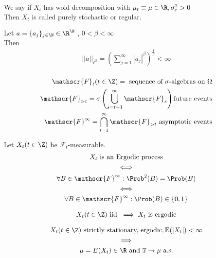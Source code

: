 \documentclass[answers,12pt,addpoints]{exam}
\begin{document}
\begin{definition}
    We say if $X_t$ has wold decomposition with $\mu_t \equiv \mu \in \R, \sigma_{\epsilon}^2 > 0$\\
    Then $X_t$ is called purely stochastic or regular.\\
\end{definition}
\begin{definition}
    Let $a = \{a_j\}_{j\in \N} \in \R^{\N}$ , $0 < \beta < \infty$\\
    Then 
    \begin{align*}
        || a ||_{\ell^{\beta}} = \left( \sum_{j=1}^{\infty} |a_j|^{\beta} \right)^{\frac{1}{\beta}} < \infty\\
    \end{align*}
\end{definition}
\begin{definition}
    \begin{align*}
        \mathscr{F}_t(t \in \Z) = \text{ sequence of $\sigma$-algebras on } \Omega\\
        \mathscr{F}_{>t} = \sigma\left( \bigcup_{s=t+1}^{\infty} \mathscr{F}_s \right) \text{future events}\\
        \mathscr{F}^{\infty} = \bigcap_{t=1}^{\infty} \mathscr{F}_{>t} \text{ asymptotic events}\\
    \end{align*}
\end{definition}
\begin{definition}
    Let $X_t(t \in \Z)$ be $\mathscr{F}_t$-measurable.\\
    \begin{gather*}
        X_t \text{ is an Ergodic process} \\
        \iff \\
        \forall B \in \mathscr{F}^{\infty}: \Prob^2(B) = \Prob(B) \\
        \iff \\
        \forall B \in \mathscr{F}^{\infty}: \Prob(B) \in \{0,1\}
    \end{gather*}
\end{definition}
\begin{theorem}
    \begin{gather*}
        X_t (t \in \Z) \text{ iid } \implies X_t \text{ is ergodic} \\ 
    \end{gather*}
\end{theorem}
\begin{theorem}
    \begin{gather*}
        X_t (t\in \Z) \text{ strictly stationary, ergodic}, \mathbb{E}(|X_t|) < \infty \\
        \implies \\
        \mu = E(X_t) \in \R \text{ and } \overline{x} \to \mu \text{ a.s.} 
    \end{gather*}
    
\end{theorem}
\end{document}
